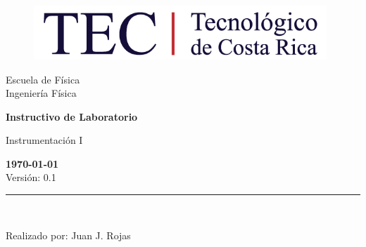 \documentclass[12pt,letterpaper]{report}
\begin{document}
\begin{titlepage}
    \begin{center}
\vspace*{1in}
\begin{figure}[htb]
\begin{center}
\includegraphics[width=11cm]{../fig/logo.png}
\end{center}
\end{figure}
\vspace*{0.4in}
\begin{Large}
Escuela de Física\\
\vspace*{0.15in}
Ingeniería Física\\
\vspace*{0.8in}
\end{Large}
\vspace*{0.2in}
\begin{Large}
\textbf{Instructivo de Laboratorio} \\
\end{Large}
\vspace*{0.3in}
\begin{large}
Instrumentación I\\
\end{large}
\vspace*{2.5in}
\begin{Large}
\textbf{\today}\\
Versión: 0.1\\
\end{Large}
\rule{80mm}{0.1mm}\\
\vspace*{0.1in}
\begin{large}
Realizado por: Juan J. Rojas\\
\end{large}
\end{center}
\end{titlepage}
\tableofcontents




\end{document}
